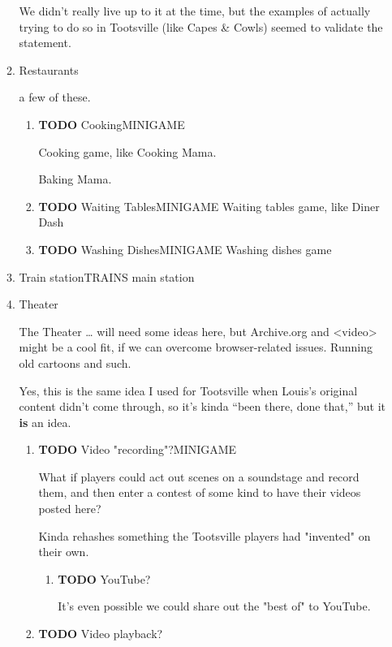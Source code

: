 \documentclass[11pt]{article}
\begin{document}
\begin{enumerate}
\begin{enumerate}
We didn't really live up to it at the time, but the examples of
actually trying to do so in Tootsville (like Capes \& Cowls) seemed to
validate the statement.
\item Restaurants
\label{sec-4-1-1-2}

a few of these.

\begin{enumerate}
\item {\bfseries\sffamily TODO} Cooking\hfill{}\textsc{MINIGAME}
\label{sec-4-1-1-2-1}

Cooking game, like Cooking Mama.

Baking  Mama. 
\item {\bfseries\sffamily TODO} Waiting Tables\hfill{}\textsc{MINIGAME}
\label{sec-4-1-1-2-2}
Waiting tables game, like Diner Dash
\item {\bfseries\sffamily TODO} Washing Dishes\hfill{}\textsc{MINIGAME}
\label{sec-4-1-1-2-3}
Washing dishes game
\end{enumerate}
\item Train station\hfill{}\textsc{TRAINS}
\label{sec-4-1-1-3}
main station
\item Theater
\label{sec-4-1-1-4}

The Theater …  will need some ideas here, but  Archive.org and <video>
might   be  a   cool   fit,  if   we   can  overcome   browser-related
issues. Running old cartoons and such.

Yes, this is the same idea I used for Tootsville when Louis's
original content didn't come through, so it's kinda “been there, done
that,” but it \textbf{is} an idea.

\begin{enumerate}
\item {\bfseries\sffamily TODO} Video "recording"?\hfill{}\textsc{MINIGAME}
\label{sec-4-1-1-4-1}

What if players could act out scenes on a soundstage and record them,
and then enter a contest of some kind to have their videos
posted here?

Kinda rehashes something the Tootsville players had "invented" on
their own.

\begin{enumerate}
\item {\bfseries\sffamily TODO} YouTube?
\label{sec-4-1-1-4-1-1}

It's even possible we could share out the "best of" to YouTube.
\end{enumerate}
\item {\bfseries\sffamily TODO} Video playback?
\label{sec-4-1-1-4-2}


\end{enumerate}
\end{enumerate}
\end{enumerate}
\end{document}

